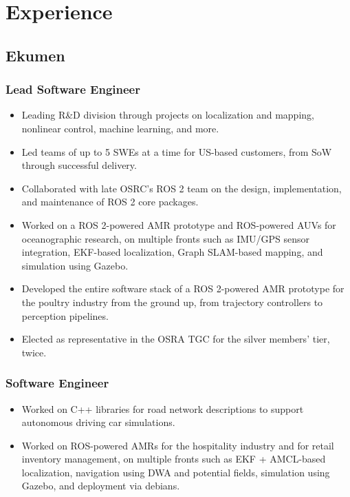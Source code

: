 \documentclass[english, letterpaper]{resume}
\renewcommand{\date}[2]{%
  \DTMenglishshortmonthname{#2} #1}
\begin{document}
\section*{Experience}

\subsection*[\icon{ekumen}]{Ekumen }

\subsubsection*{Lead Software Engineer \thru{\date{2018}{9}}{Present}}
\begin{itemize}
  \item Leading R\&D division through projects on localization and mapping, nonlinear control, machine learning, and more.
  \item Led teams of up to 5 SWEs at a time for US-based customers, from SoW through successful delivery.
  \item Collaborated with late OSRC's ROS 2 team on the design, implementation, and maintenance of ROS 2 core packages.
  \item Worked on a ROS 2-powered AMR prototype and ROS-powered AUVs for oceanographic research, on multiple fronts such as IMU/GPS sensor integration, EKF-based localization, Graph SLAM-based mapping, and simulation using Gazebo.
  \item Developed the entire software stack of a ROS 2-powered AMR prototype for the poultry industry from the ground up, from trajectory controllers to perception pipelines.
  \item Elected as representative in the OSRA TGC for the silver members' tier, twice.
\end{itemize}

\subsubsection*{Software Engineer \thru{\date{2015}{8}}{\date{2018}{9}}}
\begin{itemize}
  \item Worked on C++ libraries for road network descriptions to support autonomous driving car simulations.
  \item Worked on ROS-powered AMRs for the hospitality industry and for retail inventory management, on multiple fronts such as EKF + AMCL-based localization, navigation using DWA and potential fields, simulation using Gazebo, and deployment via debians.
\end{itemize}
\end{document}
